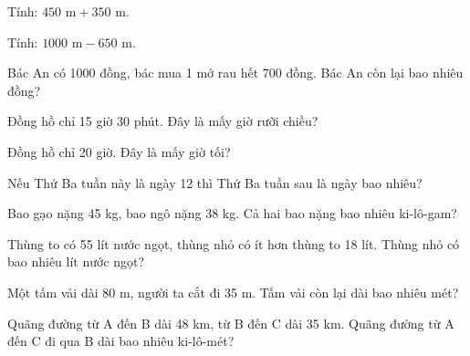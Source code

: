 \begin{ex}
Tính: $450\text{ m} + 350\text{ m}$.
\end{ex}

\begin{ex}
Tính: $1000\text{ m} - 650\text{ m}$.
\end{ex}

\begin{ex}
Bác An có 1000 đồng, bác mua 1 mớ rau hết 700 đồng. Bác An còn lại bao nhiêu đồng?
\end{ex}

\begin{ex}
Đồng hồ chỉ 15 giờ 30 phút. Đây là mấy giờ rưỡi chiều?
\end{ex}

\begin{ex}
Đồng hồ chỉ 20 giờ. Đây là mấy giờ tối?
\end{ex}

\begin{ex}
Nếu Thứ Ba tuần này là ngày 12 thì Thứ Ba tuần sau là ngày bao nhiêu?
\end{ex}

\begin{ex}
Bao gạo nặng 45 kg, bao ngô nặng 38 kg. Cả hai bao nặng bao nhiêu ki-lô-gam?
\end{ex}

\begin{ex}
Thùng to có 55 lít nước ngọt, thùng nhỏ có ít hơn thùng to 18 lít. Thùng nhỏ có bao nhiêu lít nước ngọt?
\end{ex}

\begin{ex}
Một tấm vải dài 80 m, người ta cắt đi 35 m. Tấm vải còn lại dài bao nhiêu mét?
\end{ex}

\begin{ex}
Quãng đường từ A đến B dài 48 km, từ B đến C dài 35 km. Quãng đường từ A đến C đi qua B dài bao nhiêu ki-lô-mét?
\end{ex}

